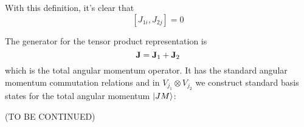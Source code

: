 \documentclass[a4paper,11pt]{article}
\begin{document}
	With this definition, it's clear that
	\[
		[J _{1i}, J _{2j}] = 0
	\]

	The generator for the tensor product representation is
	\[
		\vb J = \vb J_1 + \vb J_2
	\]
	which is the total angular momentum operator. It has the standard angular momentum commutation relations and in $V _{j_1}\otimes V _{j_2}$ we construct standard basis states for the total angular momentum $\ket{JM}$: 

	(TO BE CONTINUED)
	
	 
	

	
\end{document}
